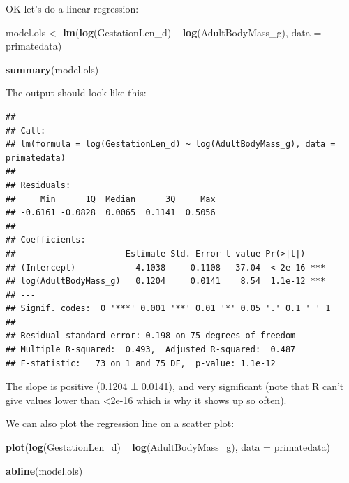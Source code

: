 \documentclass[12pt]{article}
\newcommand{\KeywordTok}[1]{\textcolor[rgb]{0.13,0.29,0.53}{\textbf{{#1}}}}
\newcommand{\DataTypeTok}[1]{\textcolor[rgb]{0.13,0.29,0.53}{{#1}}}
\newcommand{\StringTok}[1]{\textcolor[rgb]{0.31,0.60,0.02}{{#1}}}
\newcommand{\NormalTok}[1]{{#1}}
\begin{document}
OK let's do a linear regression:

\begin{snugshade}
\begin{Highlighting}[]
\NormalTok{model.ols <-}\StringTok{ }\KeywordTok{lm}\NormalTok{(}\KeywordTok{log}\NormalTok{(GestationLen_d) ~}\StringTok{ }\KeywordTok{log}\NormalTok{(AdultBodyMass_g), }
      \DataTypeTok{data =} \NormalTok{primatedata)}

\KeywordTok{summary}\NormalTok{(model.ols)}
\end{Highlighting}
\end{snugshade}

\newpage
The output should look like this: 

\begin{verbatim}
## 
## Call:
## lm(formula = log(GestationLen_d) ~ log(AdultBodyMass_g), data = primatedata)
## 
## Residuals:
##     Min      1Q  Median      3Q     Max 
## -0.6161 -0.0828  0.0065  0.1141  0.5056 
## 
## Coefficients:
##                      Estimate Std. Error t value Pr(>|t|)    
## (Intercept)            4.1038     0.1108   37.04  < 2e-16 ***
## log(AdultBodyMass_g)   0.1204     0.0141    8.54  1.1e-12 ***
## ---
## Signif. codes:  0 '***' 0.001 '**' 0.01 '*' 0.05 '.' 0.1 ' ' 1
## 
## Residual standard error: 0.198 on 75 degrees of freedom
## Multiple R-squared:  0.493,  Adjusted R-squared:  0.487 
## F-statistic:   73 on 1 and 75 DF,  p-value: 1.1e-12
\end{verbatim}

The slope is positive (0.1204 ± 0.0141), and very significant (note that R can’t give values lower than <2e-16 which is why it shows up so often). 

We can also plot the regression line on a scatter plot:

\begin{snugshade}
\begin{Highlighting}[]
\KeywordTok{plot}\NormalTok{(}\KeywordTok{log}\NormalTok{(GestationLen_d) ~}\StringTok{ }\KeywordTok{log}\NormalTok{(AdultBodyMass_g), }\DataTypeTok{data =} \NormalTok{primatedata)}

\KeywordTok{abline}\NormalTok{(model.ols)}
\end{Highlighting}
\end{snugshade}

 
\end{document}
